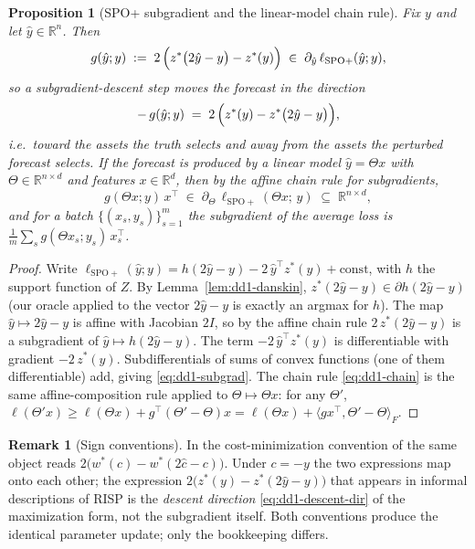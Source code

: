 \documentclass[11pt,a4paper]{article}
\theoremstyle{definition}
\newtheorem{remark}{Remark}[section]
\theoremstyle{plain}
\newtheorem{proposition}{Proposition}[section]
\newcommand{\R}{\mathbb{R}}
\newcommand{\nm}{\textsc{RISP}}
\begin{document}
\begin{proposition}[SPO+ subgradient and the linear-model chain rule]
\label{prop:dd1-spoplus-grad}
Fix $y$ and let $\hat{y} \in \R^n$. Then
\begin{equation}
\label{eq:dd1-subgrad}
g(\hat{y}; y) \;:=\; 2\,\Bigl( z^*\bigl(2\hat{y} - y\bigr) - z^*(y) \Bigr)
\;\in\; \partial_{\hat{y}}\, \ell_{\mathrm{SPO+}}(\hat{y}; y),
\end{equation}
so a subgradient-descent step moves the forecast in the direction
\begin{equation}
\label{eq:dd1-descent-dir}
-\,g(\hat{y}; y) \;=\; 2\,\Bigl( z^*(y) - z^*\bigl(2\hat{y} - y\bigr) \Bigr),
\end{equation}
i.e.\ \emph{toward} the assets the truth selects and \emph{away from} the
assets the perturbed forecast selects. If the forecast is produced by a linear
model $\hat{y} = \Theta x$ with $\Theta \in \R^{n \times d}$ and features
$x \in \R^d$, then by the affine chain rule for subgradients,
\begin{equation}
\label{eq:dd1-chain}
g(\Theta x; y)\, x^\top \;\in\; \partial_{\Theta}\,
\ell_{\mathrm{SPO+}}(\Theta x;\, y) \;\subseteq\; \R^{n \times d},
\end{equation}
and for a batch $\{(x_s, y_s)\}_{s=1}^m$ the subgradient of the average loss
is $\frac{1}{m} \sum_s g(\Theta x_s; y_s)\, x_s^\top$.
\end{proposition}

\begin{proof}
Write $\ell_{\mathrm{SPO+}}(\hat{y}; y) = h(2\hat{y} - y) - 2\,\hat{y}^\top
z^*(y) + \text{const}$, with $h$ the support function of $Z$. By
Lemma~\ref{lem:dd1-danskin}, $z^*(2\hat{y} - y) \in \partial h(2\hat{y} - y)$
(our oracle applied to the vector $2\hat{y} - y$ is exactly an argmax for
$h$). The map $\hat{y} \mapsto 2\hat{y} - y$ is affine with Jacobian $2 I$, so
by the affine chain rule $2\,z^*(2\hat{y} - y)$ is a subgradient of
$\hat{y} \mapsto h(2\hat{y} - y)$. The term $-2\,\hat{y}^\top z^*(y)$ is
differentiable with gradient $-2\,z^*(y)$. Subdifferentials of sums of convex
functions (one of them differentiable) add, giving \eqref{eq:dd1-subgrad}.
The chain rule \eqref{eq:dd1-chain} is the same affine-composition rule
applied to $\Theta \mapsto \Theta x$: for any $\Theta'$,
$\ell(\Theta' x) \ge \ell(\Theta x) + g^\top(\Theta' - \Theta)x
= \ell(\Theta x) + \langle g x^\top, \Theta' - \Theta\rangle_F$.
\end{proof}

\begin{remark}[Sign conventions]
\label{rem:dd1-sign}
In the cost-minimization convention of \cite{elmachtoub2022smart} the same
object reads $2\bigl(w^*(c) - w^*(2\hat{c} - c)\bigr)$. Under $c = -y$ the two
expressions map onto each other; the expression
$2\bigl(z^*(y) - z^*(2\hat{y} - y)\bigr)$ that appears in informal
descriptions of \nm{} is the \emph{descent direction}
\eqref{eq:dd1-descent-dir} of the maximization form, not the subgradient
itself. Both conventions produce the identical parameter update; only the
bookkeeping differs.
\end{remark}
\end{document}
